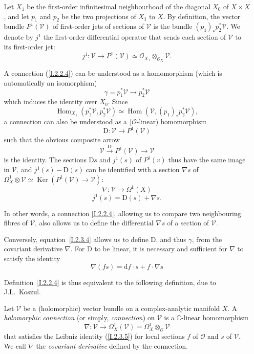 \documentclass{report}
\theoremstyle{plain}
\theoremstyle{definition}
\newenvironment{definition}[1]
    {\renewcommand\theinnercustomdefinition{#1}\innercustomdefinition}
    {\endinnercustomdefinition}
\newenvironment{env}[1]
    {\renewcommand\theinnercustomenv{#1}\innercustomenv}
    {\endinnercustomenv}
\newcommand{\sh}[1]{{\mathscr{#1}}}
\newcommand{\dd}{\mathrm{d}}
\newcommand{\DD}{\mathrm{D}}
\DeclareMathOperator{\Ker}{Ker}
\DeclareMathOperator{\Hom}{Hom}
\newcommand{\oldpage}[1]{\marginpar{\footnotesize$\Big\vert$ \textit{p.~#1}}}
\begin{document}
\begin{env}{2.3}
\label{I.2.3}
  Let $X_1$ be the first-order infinitesimal neighbourhood of the diagonal $X_0$ of $X\times X$, and let $p_1$ and $p_2$ be the two projections of $X_1$ to $X$.
  By definition, the vector bundle $P^1(\sh{V})$ of first-order jets of sections of $\sh{V}$ is the bundle $(p_1)_*p_2^*\sh{V}$.
  We denote by $j^1$ the first-order differential operator that sends each section of $\sh{V}$ to its first-order jet:
  \[
    j^1\colon \sh{V} \to P^1(\sh{V}) \simeq \sh{O}_{X_1}\otimes_{\sh{O}_X}\sh{V}.
  \]

  A connection (\cref{I.2.2.4}) can be understood as a homomorphism (which is automatically an isomorphism)
  \[
  \label{I.2.3.1}
    \gamma = p_1^*\sh{V} \to p_2^*\sh{V}
  \tag{2.3.1}
  \]
  which induces the identity over $X_0$.
  Since
  \[
    \Hom_{X_1}(p_1^*\sh{V},p_2^*\sh{V}) \simeq \Hom(\sh{V},(p_1)_*p_2^*\sh{V}),
  \]
\oldpage{7}
  a connection can also be understood as a ($\sh{O}$-linear) homomorphism
  \[
  \label{I.2.3.2}
    \DD\colon \sh{V} \to P^1(\sh{V})
  \tag{2.3.2}
  \]
  such that the obvious composite arrow
  \[
    \sh{V}\xrightarrow{\DD} P^1(\sh{V}) \to \sh{V}
  \]
  is the identity.
  The sections $\DD s$ and $j^1(s)$ of $P^1(v)$ thus have the same image in $\sh{V}$, and $j^1(s)-\DD(s)$ can be identified with a section $\nabla s$ of $\Omega_X^1\otimes\sh{V} \simeq \Ker(P^1(\sh{V})\to\sh{V})$:
  \[
  \label{I.2.3.3}
    \nabla\colon \sh{V} \to \Omega^1(X)
  \tag{2.3.3}
  \]
  \[
  \label{I.2.3.4}
    j^1(s) = \DD(s)+\nabla s.
  \tag{2.3.4}
  \]

  In other words, a connection \cref{I.2.2.4}, allowing us to compare two neighbouring fibres of $\sh{V}$, also allows us to define the differential $\nabla s$ of a section of $\sh{V}$.

  Conversely, equation~\cref{I.2.3.4} allows us to define $\DD$, and thus $\gamma$, from the covariant derivative $\nabla$.
  For $\DD$ to be linear, it is necessary and sufficient for $\nabla$ to satisfy the identity
  \[
  \label{I.2.3.5}
    \nabla(fs) = \dd f\cdot s + f\cdot\nabla s
  \tag{2.3.5}
  \]

  Definition~\cref{I.2.2.4} is thus equivalent to the following definition, due to J.L.~Koszul.
\end{env}

\begin{definition}{2.4}
\label{I.2.4}
  Let $\sh{V}$ be a (holomorphic) vector bundle on a complex-analytic manifold $X$.
  A \emph{holomorphic connection} (or simply, \emph{connection}) on $\sh{V}$ is a $\mathbb{C}$-linear homomorphism
  \[
    \nabla\colon \sh{V} \to \Omega_X^1(\sh{V}) = \Omega_X^1\otimes_{\sh{O}}\sh{V}
  \]
  that satisfies the Leibniz identity (\cref{I.2.3.5}) for local sections $f$ of $\sh{O}$ and $s$ of $\sh{V}$.
  We call $\nabla$ the \emph{covariant derivative} defined by the connection.
\end{definition}
\end{document}
